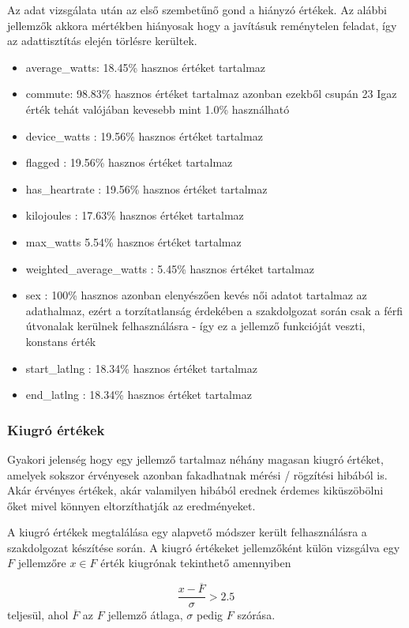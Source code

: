 Az adat vizsgálata után az első szembetűnő gond a hiányzó értékek. Az alábbi jellemzők akkora mértékben hiányosak hogy a javításuk reménytelen feladat, így az adattisztítás elején törlésre kerültek.
\begin{itemize}
	\item average\_watts: 18.45\% hasznos értéket tartalmaz
	\item commute: 98.83\% hasznos értéket tartalmaz azonban ezekből csupán 23 Igaz érték tehát valójában kevesebb mint 1.0\% használható 
	\item device\_watts : 19.56\% hasznos értéket tartalmaz
	\item flagged : 19.56\% hasznos értéket tartalmaz
	\item has\_heartrate : 19.56\% hasznos értéket tartalmaz
	\item kilojoules : 17.63\% hasznos értéket tartalmaz
	\item max\_watts 5.54\% hasznos értéket tartalmaz
	\item weighted\_average\_watts : 5.45\% hasznos értéket tartalmaz
	\item sex : 100\% hasznos azonban elenyészően kevés női adatot tartalmaz az adathalmaz, ezért a torzítatlanság érdekében a szakdolgozat során csak a férfi útvonalak kerülnek felhasználásra - így ez a jellemző funkcióját veszti, konstans érték
	\item start\_latlng : 18.34\% hasznos értéket tartalmaz
	\item end\_latlng : 18.34\% hasznos értéket tartalmaz
\end{itemize}


\subsubsection{Kiugró értékek}
Gyakori jelenség hogy egy jellemző tartalmaz néhány magasan kiugró értéket, amelyek sokszor érvényesek azonban fakadhatnak mérési / rögzítési hibából is. Akár érvényes értékek, akár valamilyen hibából erednek érdemes kiküszöbölni őket mivel könnyen eltorzíthatják az eredményeket. 

A kiugró értékek megtalálása egy alapvető módszer került felhasználásra a szakdolgozat készítése során. A kiugró értékeket jellemzőként külön vizsgálva egy $F$ jellemzőre $x \in F$ érték kiugrónak tekinthető amennyiben

\[  \frac{x - \overline{F}}{\sigma} > 2.5\]
teljesül, ahol $\overline{F}$ az $F$ jellemző átlaga, $\sigma$ pedig $F$ szórása.

